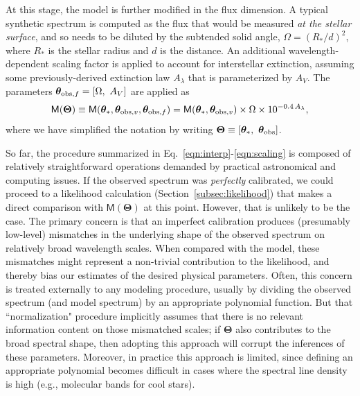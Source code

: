 \documentclass[iop,floatfix]{emulateapj}
\newcommand{\vM}{\mathsf{M}}
\newcommand{\vt}{ {\bm \theta}}
\newcommand{\vT}{ {\bm \Theta}}
\begin{document}
At this stage, the model is further modified in the flux dimension.  A typical synthetic spectrum 
is computed as the flux that would be measured {\it at the stellar surface}, and so needs to be 
diluted by the subtended solid angle, $\Omega = (R_{\ast}/d)^2$, where $R_{\ast}$ is the stellar 
radius and $d$ is the distance.  An additional wavelength-dependent scaling factor is applied to 
account for interstellar extinction, assuming some previously-derived extinction law $A_{\lambda}$ 
\citep[e.g.,][]{cardelli89} that is parameterized by $A_V$.  The parameters $\vt_{{\rm obs}, f} = 
[\Omega, \,\, A_V]$ are applied as
\begin{equation}
\vM(\vT) \equiv \vM(\vt_{\ast}, \vt_{{\rm obs},v}, \vt_{{\rm obs},f}) = \vM(\vt_{\ast}, \vt_{{\rm obs}, v}) \times \Omega \times 10^{-0.4\,A_{\lambda}},
\label{eqn:scaling}
\end{equation}
where we have simplified the notation by writing $\vT \equiv [\vt_{\ast}, \,\, \vt_{\rm obs}]$.

So far, the procedure summarized in Eq.~\ref{eqn:interp}-\ref{eqn:scaling} is composed of 
relatively straightforward operations demanded by practical astronomical and computing issues.  If 
the observed spectrum was {\it perfectly} calibrated, we could proceed to a likelihood calculation 
(Section~\ref{subsec:likelihood}) that makes a direct comparison with $\vM(\vT)$ at this point.  
However, that is unlikely to be the case.  The primary concern is that an imperfect calibration 
produces (presumably low-level) mismatches in the underlying shape of the observed spectrum on 
relatively broad wavelength scales.  When compared with the model, these mismatches might represent 
a non-trivial contribution to the likelihood, and thereby bias our estimates of the desired 
physical parameters.  Often, this concern is treated externally to any modeling procedure, usually 
by dividing the observed spectrum (and model spectrum) by an appropriate polynomial function.  But 
that ``normalization" procedure implicitly assumes that there is no relevant information content on 
those mismatched scales; if $\vT$ also contributes to the broad spectral shape, then adopting this 
approach will corrupt the inferences of these parameters.  Moreover, in practice this approach is 
limited, since defining an appropriate polynomial becomes difficult in cases where the spectral 
line density is high (e.g., molecular bands for cool stars).  
\end{document}
